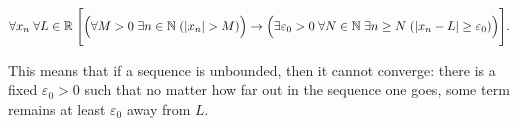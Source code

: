 \begin{remark*}
\[
\forall x_n \; \forall L \in \mathbb{R}\;
\Biggl[
\Bigl(
\forall M > 0 \; \exists n \in \mathbb{N} \; (|x_n| > M)
\Bigr)
\rightarrow
\Bigl(
\exists \varepsilon_0 > 0 \; \forall N \in \mathbb{N} \; \exists n \ge N \;
(|x_n - L| \ge \varepsilon_0)
\Bigr)
\Biggr].
\]

This means that if a sequence is unbounded, then it cannot converge: there is a fixed
$\varepsilon_0 > 0$ such that no matter how far out in the sequence one goes, some term
remains at least $\varepsilon_0$ away from $L$.
\end{remark*}
